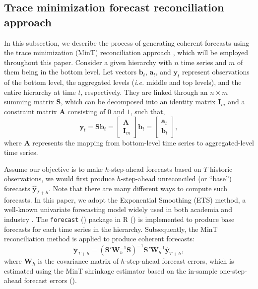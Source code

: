 \documentclass[a4paper,review,12pt,authoryear]{elsarticle}
\let\code=\texttt
\begin{document}
\subsection{Trace minimization forecast reconciliation approach}


In this subsection, we describe the process of generating coherent forecasts using the trace minimization (MinT) reconciliation approach \citep{wickramasuriyaOptimalForecastReconciliation2019}, which will be employed throughout this paper. Consider a given hierarchy with $n$ time series and $m$ of them being in the bottom level.  Let vectors $\boldsymbol{b}_t$, $\boldsymbol{a}_t$, and $\boldsymbol{y}_t$ represent observations of the bottom level, the aggregated levels (\textit{i.e.} middle and top levels), and the entire hierarchy at time $t$, respectively.
They are linked through an $n\times m$ summing matrix $\boldsymbol{S}$, which can be decomposed into an identity matrix $\boldsymbol{I}_m$ and a constraint matrix $\boldsymbol{A}$ consisting of $0$ and $1$, such that, 
\[
  \boldsymbol{y}_t = \boldsymbol{S}\boldsymbol{b}_t = \begin{bmatrix}
    \boldsymbol{A} \\ \boldsymbol{I}_m 
  \end{bmatrix}  \boldsymbol{b}_t = \begin{bmatrix}
      \boldsymbol{a}_t \\ \boldsymbol{b}_t
  \end{bmatrix},
\]
where $\boldsymbol{A}$ represents the mapping from bottom-level time series to aggregated-level time series. 

Assume our objective is to make $h$-step-ahead forecasts based on $T$ historic observations, we would first produce $h$-step-ahead unreconciled (or ``base'') forecasts $\hat{\boldsymbol{y}}_{T+h}$. Note that there are many different ways to compute such forecasts. In this paper, we adopt the Exponential Smoothing (ETS) method, a well-known univariate forecasting model widely used in both academia and industry \citep{ForecastingExponentialSmoothing}. 
The \code{forecast} (\citealp{forecast}) package in {R} (\citealp{R}) is implemented to produce base forecasts for each time series in the hierarchy.
Subsequently, the MinT reconciliation method is applied to produce coherent forecasts:
\[
    \tilde{\boldsymbol{y}}_{T+h} = (\boldsymbol{S}'\boldsymbol{W}_h^{-1}\boldsymbol{S})^{-1}\boldsymbol{S}'\boldsymbol{W}_h^{-1}\hat{\boldsymbol{y}}_{T+h},
\]
where $\boldsymbol{W}_h$ is the covariance matrix of $h$-step-ahead forecast errors, which is estimated using the MinT shrinkage estimator based on the in-sample one-step-ahead forecast errors (\citealp{wickramasuriyaOptimalForecastReconciliation2019}). 
\end{document}

